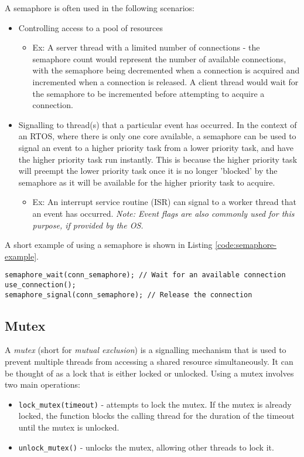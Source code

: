 \documentclass[main.tex]{subfiles}
\begin{document}
\noindent A semaphore is often used in the following scenarios:
\begin{itemize}
    \item Controlling access to a pool of resources 
    \begin{itemize}
        \item Ex: A server thread with a limited number of connections - the semaphore count would represent the number of available connections, with the semaphore being decremented when a connection is acquired and incremented when a connection is released. A client thread would wait for the semaphore to be incremented before attempting to acquire a connection.
    \end{itemize}
    \item Signalling to thread(s) that a particular event has occurred. In the context of an RTOS, where there is only one core available, a semaphore can be used to signal an event to a higher priority task from a lower priority task, and have the higher priority task run instantly. This is because the higher priority task will preempt the lower priority task once it is no longer 'blocked' by the semaphore as it will be available for the higher priority task to acquire.
    \begin {itemize}
        \item Ex: An interrupt service routine (ISR) can signal to a worker thread that an event has occurred. \textit{Note: Event flags are also commonly used for this purpose, if provided by the OS.}
    \end{itemize}
\end{itemize}
A short example of using a semaphore is shown in Listing \ref{code:semaphore-example}.
\begin{lstlisting}[caption={Example of Semaphore Usage}, label={code:semaphore-example}]
semaphore_wait(conn_semaphore); // Wait for an available connection
use_connection();
semaphore_signal(conn_semaphore); // Release the connection
\end{lstlisting}    

\subsection{Mutex}
A \textit{mutex} (short for \textit{mutual exclusion}) is a signalling mechanism that is used to prevent multiple threads from accessing a shared resource simultaneously. It can be thought of as a lock that is either locked or unlocked.
\newline
\newline
\noindent Using a mutex involves two main operations: \begin{itemize}
    \item \texttt{lock\_mutex(timeout)} - attempts to lock the mutex. If the mutex is already locked, the function blocks the calling thread for the duration of the timeout until the mutex is unlocked.
    \item \texttt{unlock\_mutex()} - unlocks the mutex, allowing other threads to lock it.
\end{itemize}
\end{document}
